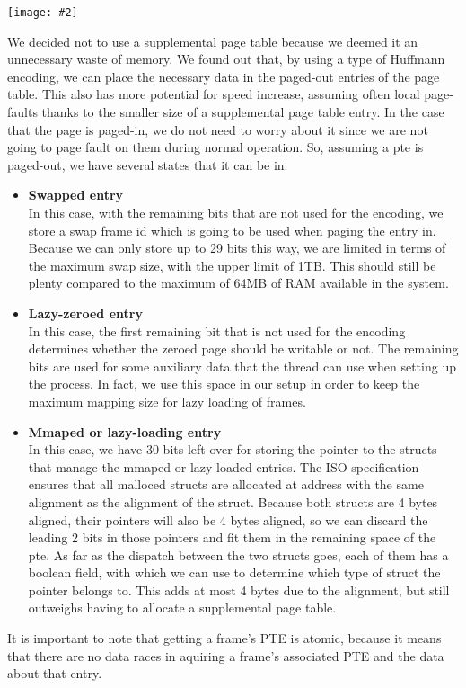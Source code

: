 \documentclass{report}
\newcommand{\bullpara}[2]{\item \textbf{#1} \ #2}
\newcommand{\centerimage}[2]{\begin{center}
	\texttt{[image: \#2]}
\end{center}}
\newcommand{\compitem}[1]{\begin{itemize}\setlength\itemsep{-0.1em}#1\end{itemize}}
\begin{document}
				\centerimage{width=\textwidth}{page table entry.png}
				We decided not to use a supplemental page table because we deemed
				it an unnecessary waste of memory. We found out that, by using a 
				type of Huffmann encoding, we can place the necessary data in 
				the paged-out entries of the page table. This also has more 
				potential for speed increase, assuming often local page-faults 
				thanks to the smaller size of a supplemental page table entry. 
				In the case that the page is paged-in, we do not need to worry
				about it since we are not going to page fault on them during
				normal operation. So, assuming a pte is paged-out, we have
				several states that it can be in:
				\compitem{
					\bullpara{Swapped entry}
						{\\In this case, with the remaining bits that are not used for the encoding,
						we store a swap frame id which is going to be used when paging
						the entry in. Because we can only store up to 29 bits this
						way, we are limited in terms of the maximum swap size, with the upper limit of 1TB.
						This should still be plenty compared to the maximum of 64MB
						of RAM available in the system.}
					\bullpara{Lazy-zeroed entry}
						{\\In this case, the first remaining bit that is not used for the encoding
						determines whether the zeroed page should be
						writable or not. The remaining bits are used for some auxiliary
						data that the thread can use when setting up the process.
						In fact, we use this space in our setup in order to keep the
						maximum mapping size for lazy loading of frames.}
					\bullpara{Mmaped or lazy-loading entry}
						{\\ In this case, we have 30 bits left over for storing the
						pointer to the structs that manage the mmaped or lazy-loaded
						entries. The ISO specification ensures that all malloced structs are
						allocated at address with the same alignment as the alignment of the struct.
						Because both structs are 4 bytes aligned, their pointers will also be 4 bytes aligned,
						so we can discard the leading 2 bits in those pointers and fit them in
						the remaining space of the pte. As far as the dispatch between the
						two structs goes, each of them has a boolean field, 
						with which we can use to determine which type of struct the pointer belongs to.
						This adds at most 4 bytes due to the alignment, but
						still outweighs having to allocate a supplemental page table.}
				}

				It is important to note that getting a frame's PTE is atomic, because it means that
				there are no data races in aquiring a frame's associated PTE and the data about that entry.
				
\end{document}
